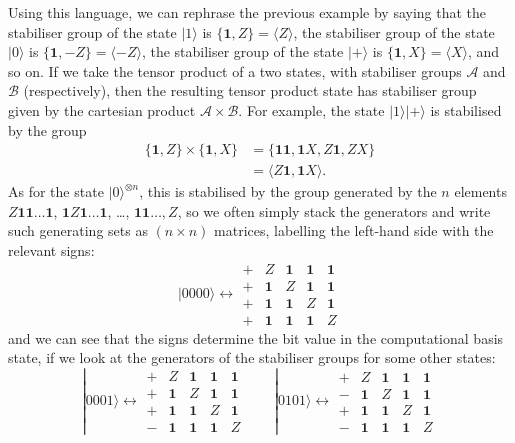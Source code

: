 \documentclass[fleqn,a4paper]{article}
\theoremstyle{definition}
\theoremstyle{definition}
\theoremstyle{definition}
\theoremstyle{definition}
\theoremstyle{remark}
\begin{document}
Using this language, we can rephrase the previous example by saying that the stabiliser group of the state \(|1\rangle\) is \(\{\mathbf{1},Z\}=\langle Z\rangle\), the stabiliser group of the state \(|0\rangle\) is \(\{\mathbf{1},-Z\}=\langle -Z\rangle\), the stabiliser group of the state \(|+\rangle\) is \(\{\mathbf{1},X\}=\langle X\rangle\), and so on.
If we take the tensor product of a two states, with stabiliser groups \(\mathcal{A}\) and \(\mathcal{B}\) (respectively), then the resulting tensor product state has stabiliser group given by the cartesian product \(\mathcal{A}\times\mathcal{B}\).
For example, the state \(|1\rangle|+\rangle\) is stabilised by the group
\[
  \begin{aligned}
    \{\mathbf{1},Z\}\times\{\mathbf{1},X\}
    &= \{\mathbf{1}\mathbf{1},\mathbf{1}X,Z\mathbf{1},ZX\}
  \\&= \langle Z\mathbf{1},\mathbf{1}X\rangle.
  \end{aligned}
\]
As for the state \(|0\rangle^{\otimes n}\), this is stabilised by the group generated by the \(n\) elements \(Z\mathbf{1}\mathbf{1}\ldots\mathbf{1}\), \(\mathbf{1}Z\mathbf{1}\ldots\mathbf{1}\), \ldots, \(\mathbf{1}\mathbf{1}\ldots,Z\), so we often simply stack the generators and write such generating sets as \((n\times n)\) matrices, labelling the left-hand side with the relevant signs:
\[
  |0000\rangle
  \longleftrightarrow
  \begin{array}{c|cccc|}
    +&Z&\mathbf{1}&\mathbf{1}&\mathbf{1}
  \\+&\mathbf{1}&Z&\mathbf{1}&\mathbf{1}
  \\+&\mathbf{1}&\mathbf{1}&Z&\mathbf{1}
  \\+&\mathbf{1}&\mathbf{1}&\mathbf{1}&Z
  \end{array}
\]
and we can see that the signs determine the bit value in the computational basis state, if we look at the generators of the stabiliser groups for some other states:
\[
  |0001\rangle
  \longleftrightarrow
  \begin{array}{c|cccc|}
    +&Z&\mathbf{1}&\mathbf{1}&\mathbf{1}
  \\+&\mathbf{1}&Z&\mathbf{1}&\mathbf{1}
  \\+&\mathbf{1}&\mathbf{1}&Z&\mathbf{1}
  \\-&\mathbf{1}&\mathbf{1}&\mathbf{1}&Z
  \end{array}
  \qquad
  |0101\rangle
  \longleftrightarrow
  \begin{array}{c|cccc|}
    +&Z&\mathbf{1}&\mathbf{1}&\mathbf{1}
  \\-&\mathbf{1}&Z&\mathbf{1}&\mathbf{1}
  \\+&\mathbf{1}&\mathbf{1}&Z&\mathbf{1}
  \\-&\mathbf{1}&\mathbf{1}&\mathbf{1}&Z
  \end{array}
\]
\end{document}

